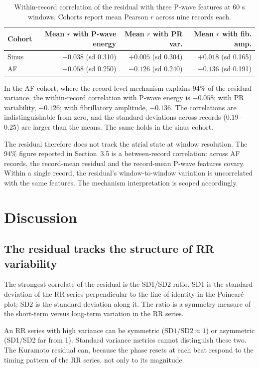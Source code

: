\documentclass[11pt]{article}
\begin{document}
\begin{table}[h]
\centering
\begin{tabular}{lrrr}
\toprule
Cohort & Mean $r$ with P-wave energy & Mean $r$ with PR var. & Mean $r$ with fib. amp. \\
\midrule
Sinus & $+0.038$ (sd 0.310) & $+0.005$ (sd 0.304) & $+0.018$ (sd 0.165) \\
AF    & $-0.058$ (sd 0.250) & $-0.126$ (sd 0.240) & $-0.136$ (sd 0.191) \\
\bottomrule
\end{tabular}
\caption{Within-record correlation of the residual with three P-wave
features at 60 s windows. Cohorts report mean Pearson $r$ across nine
records each.}
\label{tab:within-corr}
\end{table}

In the AF cohort, where the record-level mechanism explains 94\% of the
residual variance, the within-record correlation with P-wave energy is
$-0.058$; with PR variability, $-0.126$; with fibrillatory amplitude,
$-0.136$. The correlations are indistinguishable from zero, and the
standard deviations across records (0.19--0.25) are larger than the
means. The same holds in the sinus cohort.

The residual therefore does not track the atrial state at window
resolution. The 94\% figure reported in Section~3.5 is a
between-record correlation: across AF records, the record-mean residual
and the record-mean P-wave features covary. Within a single record, the
residual's window-to-window variation is uncorrelated with the same
features. The mechanism interpretation is scoped accordingly.

\section{Discussion}

\subsection{The residual tracks the structure of RR variability}

The strongest correlate of the residual is the SD1/SD2 ratio. SD1 is
the standard deviation of the RR series perpendicular to the line of
identity in the Poincar\'e plot; SD2 is the standard deviation along
it. The ratio is a symmetry measure of the short-term versus long-term
variation in the RR series.

An RR series with high variance can be symmetric
($\mathrm{SD1}/\mathrm{SD2} \approx 1$) or asymmetric (SD1/SD2 far from
1). Standard variance metrics cannot distinguish these two. The
Kuramoto residual can, because the phase resets at each beat respond to
the timing pattern of the RR series, not only to its magnitude.
\end{document}
